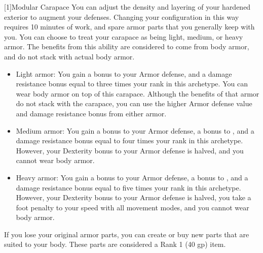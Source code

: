 [1]{Modular Carapace} You can adjust the density and layering of your hardened exterior to augment your defenses.
Changing your configuration in this way requires 10 minutes of work, and spare armor parts that you generally keep with you.
You can choose to treat your carapace as being light, medium, or heavy armor.
The benefits from this ability are considered to come from body armor, and do not stack with actual body armor.

\begin{itemize}
	\item Light armor: You gain a  bonus to your Armor defense, and a damage resistance bonus equal to three times your rank in this archetype.
	      You can wear body armor on top of this carapace.
	      Although the benefits of that armor do not stack with the carapace, you can use the higher Armor defense value and damage resistance bonus from either armor.
	\item Medium armor: You gain a  bonus to your Armor defense, a  bonus to , and a damage resistance bonus equal to four times your rank in this archetype.
	      However, your Dexterity bonus to your Armor defense is halved, and you cannot wear body armor.
	\item Heavy armor: You gain a  bonus to your Armor defense, a  bonus to , and a damage resistance bonus equal to five times your rank in this archetype.
	      However, your Dexterity bonus to your Armor defense is halved, you take a  foot penalty to your speed with all movement modes, and you cannot wear body armor.
\end{itemize}

If you lose your original armor parts, you can create or buy new parts that are suited to your body.
These parts are considered a Rank 1 (40 gp) item.

